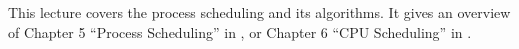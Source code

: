 This lecture covers the process scheduling and its algorithms.
It gives an overview of Chapter 5 ``Process Scheduling'' in 
\cite{Silberschatz2009osc}, or Chapter 6 ``CPU Scheduling'' in 
\cite{Silberschatz2013intl,Silberschatz2013osc}.
